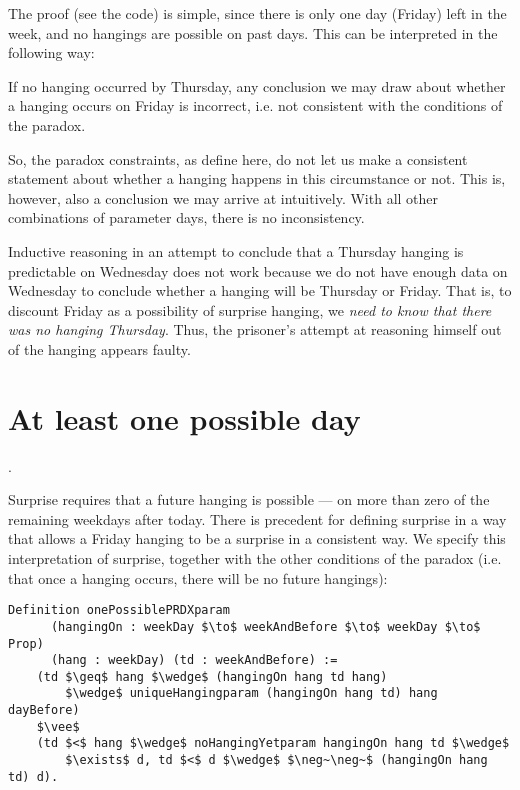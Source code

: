 \documentclass[runningheads]{llncs}
\newenvironment{myindent}{\begin{adjustwidth}{1cm}{}}{\end{adjustwidth}}
\begin{document}
The proof (see the code) is simple, since there is only one day (Friday) left in the week,
and no hangings are possible on past days. This can be interpreted in the following
way: \newline

\begin{myindent}
  If no hanging occurred by Thursday, any conclusion we may draw about whether a hanging
  occurs on Friday is incorrect, i.e. not consistent with the conditions of the paradox.
  \newline
\end{myindent}

So, the paradox constraints, as define here, do not let us make a consistent statement about
whether a hanging happens in this circumstance or not. This
is, however, also a conclusion we may arrive at intuitively. With all other combinations
of parameter days, there is no inconsistency.

Inductive reasoning in an attempt to conclude that a Thursday hanging is
predictable on Wednesday does not work because we do not have enough data on Wednesday
to conclude whether a hanging will be Thursday or Friday. That is, to discount Friday
as a possibility of surprise hanging, we \emph{need to know that there was no
hanging Thursday}. Thus, the prisoner's attempt at reasoning himself out
of the hanging appears faulty.

\section{At least one possible day}.
\label{sec:one}

Surprise requires that a future hanging is possible --- on more than zero
of the remaining weekdays after today. There is precedent \cite{fourpossible}
for defining surprise
in a way that allows a Friday hanging to be a surprise in a consistent way.
We specify this interpretation of surprise, together with the other conditions
of the paradox (i.e. that once a hanging occurs, there will be no future hangings):

\begin{lstlisting}[mathescape=true]
  Definition onePossiblePRDXparam
      (hangingOn : weekDay $\to$ weekAndBefore $\to$ weekDay $\to$ Prop)
      (hang : weekDay) (td : weekAndBefore) :=
    (td $\geq$ hang $\wedge$ (hangingOn hang td hang)
        $\wedge$ uniqueHangingparam (hangingOn hang td) hang dayBefore)
    $\vee$
    (td $<$ hang $\wedge$ noHangingYetparam hangingOn hang td $\wedge$
        $\exists$ d, td $<$ d $\wedge$ $\neg~\neg~$ (hangingOn hang td) d).
\end{lstlisting}
\end{document}
